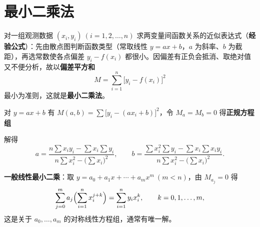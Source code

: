 
\section{最小二乘法}

对一组观测数据 $(x_i,y_i)\ (i=1,2,\dots,n)$ 求两变量间函数关系的近似表达式（\textbf{经验公式}）：先由散点图判断函数类型（常取线性 $y=ax+b$，$a$ 为斜率、$b$ 为截距），再选常数使各点偏差 $y_i-f(x_i)$ 都很小。因偏差有正负会抵消、取绝对值又不便分析，故以\textbf{偏差平方和}
\begin{equation}
M=\sum_{i=1}^{n}\bigl[y_i-f(x_i)\bigr]^{2}
\end{equation}
最小为准则，这就是\textbf{最小二乘法}。

对 $y=ax+b$ 有 $M(a,b)=\sum\bigl[y_i-(ax_i+b)\bigr]^{2}$，令 $M_a=M_b=0$ 得\textbf{正规方程组}


解得
\begin{equation}
a=\frac{n\sum x_iy_i-\sum x_i\sum y_i}{n\sum x_i^{2}-\bigl(\sum x_i\bigr)^{2}},\qquad
b=\frac{\sum x_i^{2}\sum y_i-\sum x_i\sum x_iy_i}{n\sum x_i^{2}-\bigl(\sum x_i\bigr)^{2}} .
\end{equation}

\textbf{一般线性最小二乘}：取 $y=a_0+a_1x+\cdots+a_mx^{m}\ (m<n)$，由 $M_{a_j}=0$ 得
\begin{equation}
\sum_{j=0}^{m}a_j\Bigl(\sum_{i=1}^{n}x_i^{j+k}\Bigr)=\sum_{i=1}^{n}y_ix_i^{k},
\qquad k=0,1,\dots,m,
\end{equation}
这是关于 $a_0,\dots,a_m$ 的对称线性方程组，通常有唯一解。


